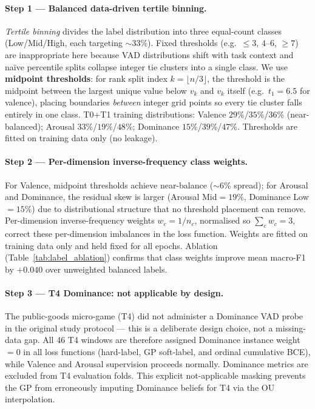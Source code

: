 \documentclass[sigconf,review,anonymous]{acmart}
\begin{document}
\paragraph{Step 1 --- Balanced data-driven tertile binning.}
\emph{Tertile binning} divides the label distribution into three equal-count
classes (Low/Mid/High, each targeting $\sim$33\%).
Fixed thresholds (e.g.\ $\leq3$, $4$--$6$, $\geq7$) are inappropriate here
because VAD distributions shift with task context and naïve percentile splits
collapse integer tie clusters into a single class.
We use \textbf{midpoint thresholds}: for rank split index
$k = \lfloor n/3 \rfloor$, the threshold is the midpoint between the largest
unique value below $v_k$ and $v_k$ itself (e.g.\ $t_1{=}6.5$ for valence),
placing boundaries \emph{between} integer grid points so every tie cluster
falls entirely in one class.
T0+T1 training distributions:
Valence $29$\%/$35$\%/$36$\% (near-balanced);
Arousal $33$\%/$19$\%/$48$\%;
Dominance $15$\%/$39$\%/$47$\%.
Thresholds are fitted on training data only (no leakage).

\paragraph{Step 2 --- Per-dimension inverse-frequency class weights.}
For Valence, midpoint thresholds achieve near-balance ($\sim\!6\%$ spread);
for Arousal and Dominance, the residual skew is larger (Arousal Mid$=19\%$,
Dominance Low$=15\%$) due to distributional structure that no threshold
placement can remove.
Per-dimension inverse-frequency weights $w_c = 1/n_c$, normalised so
$\sum_c w_c = 3$, correct these per-dimension imbalances in the loss function.
Weights are fitted on training data only and held fixed for all epochs.
Ablation (Table~\ref{tab:label_ablation}) confirms that class weights
improve mean macro-F1 by $+0.040$ over unweighted balanced labels.

\paragraph{Step 3 --- T4 Dominance: not applicable by design.}
The public-goods micro-game (T4) did not administer a Dominance VAD probe in
the original study protocol --- this is a deliberate design choice, not a
missing-data gap.  All 46 T4 windows are therefore assigned Dominance
instance weight $= 0$ in all loss functions (hard-label, GP soft-label,
and ordinal cumulative BCE), while Valence and Arousal supervision proceeds
normally.  Dominance metrics are excluded from T4 evaluation folds.
This explicit not-applicable masking prevents the GP from erroneously imputing
Dominance beliefs for T4 via the OU interpolation.
\end{document}
